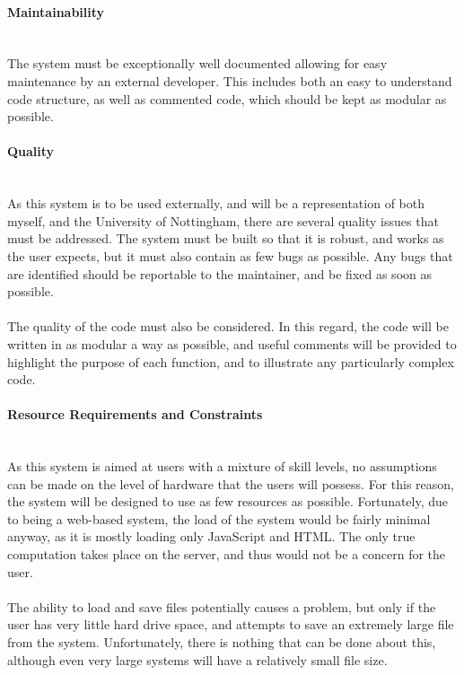 \documentclass[a4paper,twoside,notitlepage,11pt]{article}
\begin{document}
\paragraph{Maintainability}\ \\
The system must be exceptionally well documented allowing for easy maintenance by an external developer. This includes both an easy to understand code structure, as well as commented code, which should be kept as modular as possible.

\paragraph{Quality}\ \\
As this system is to be used externally, and will be a representation of both myself, and the University of Nottingham, there are several quality issues that must be addressed. The system must be built so that it is robust, and works as the user expects, but it must also contain as few bugs as possible. Any bugs that are identified should be reportable to the maintainer, and be fixed as soon as possible.\ \\
\ \\
The quality of the code must also be considered. In this regard, the code will be written in as modular a way as possible, and useful comments will be provided to highlight the purpose of each function, and to illustrate any particularly complex code.

\paragraph{Resource Requirements and Constraints}\ \\
As this system is aimed at users with a mixture of skill levels, no assumptions can be made on the level of hardware that the users will possess. For this reason, the system will be designed to use as few resources as possible. Fortunately, due to being a web-based system, the load of the system would be fairly minimal anyway, as it is mostly loading only JavaScript and HTML. The only true computation takes place on the server, and thus would not be a concern for the user.\ \\
\ \\
The ability to load and save files potentially causes a problem, but only if the user has very little hard drive space, and attempts to save an extremely large file from the system. Unfortunately, there is nothing that can be done about this, although even very large systems will have a relatively small file size.
\end{document}
